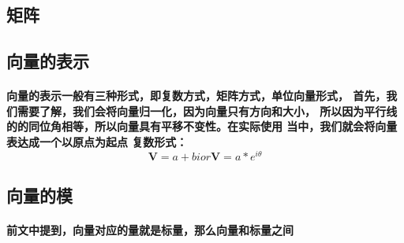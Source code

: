 \documentclass[final,11pt,oneside,UTF8]{article}
\begin{document}
\subsection{矩阵}

\subsection{向量的表示}
\paragraph{
向量的表示一般有三种形式，即复数方式，矩阵方式，单位向量形式，
首先，我们需要了解，我们会将向量归一化，因为向量只有方向和大小，
所以因为平行线的的同位角相等，所以向量具有平移不变性。在实际使用
当中，我们就会将向量表达成一个以原点为起点
复数形式：
$$\textbf{V}=a+bi or \textbf{V}=a*e^{i\theta}$$
}
\subsection{向量的模}
\paragraph{
    前文中提到，向量对应的量就是标量，那么向量和标量之间
}
\end{document}
